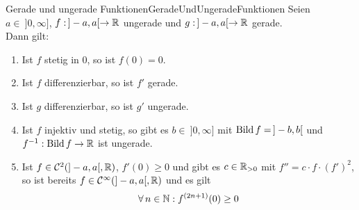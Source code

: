 \begin{lemma}{Gerade und ungerade Funktionen}{GeradeUndUngeradeFunktionen}
Seien $a \in\!\ ]0,\infty]$, $f:\!\  ]-a,a[ \rightarrow \mathbb{R}$ ungerade und
$g:\!\ ]-a,a[ \rightarrow \mathbb{R}$ gerade.\\
Dann gilt:
\begin{enumerate}[(1)]
	\item \label{GeradeUndUngeradeFunktionen1}
	Ist $f$ stetig in $0$, so ist $f(0) = 0$.
	\item \label{GeradeUndUngeradeFunktionen2}
	Ist $f$ differenzierbar, so ist $f'$ gerade.
	\item \label{GeradeUndUngeradeFunktionen3}
	Ist $g$ differenzierbar, so ist $g'$ ungerade.
	\item \label{GeradeUndUngeradeFunktionen4}
	Ist $f$ injektiv und stetig, so gibt es $b \in \!\ ]0,\infty]$ mit 
	$\mathop{\textrm{Bild}}\nolimits f=\!\  ]-b,b[$
	und $f^{-1}: \mathop{\textrm{Bild}}\nolimits f \rightarrow \mathbb{R}$ ist ungerade.
	\item \label{GeradeUndUngeradeFunktionen5}
	Ist $f \in \mathcal{C}^2(]-a,a[, \mathbb{R})$, $f'(0) \ge 0$ und gibt es $c \in \mathbb{R}_{>0}$ mit
	$f'' = c\cdot f\cdot(f')^2$, so ist bereits $f \in \mathcal{C}^\infty(]-a,a[,\mathbb{R})$
	und es gilt \[\forall\, n \in \mathbb{N}: f^{(2n+1)}(0) \ge 0\] 
\end{enumerate}
\end{lemma}
